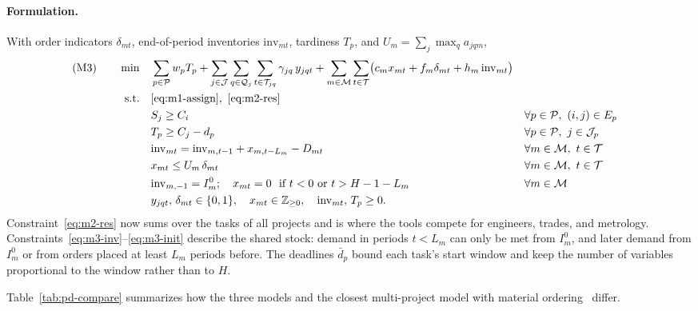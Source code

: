 \paragraph{Formulation.}
With order indicators $\delta_{mt}$, end-of-period inventories
$\mathrm{inv}_{mt}$, tardiness $T_p$, and
$U_m = \sum_{j} \max_{q} a_{jqm}$,
\begin{align}
    \text{(M3)} \qquad \min \quad
    & \sum_{p \in \mathcal{P}} w_p T_p
      + \sum_{j \in \mathcal{J}} \sum_{q \in \mathcal{Q}_j} \sum_{t \in \mathcal{T}_{jq}} \gamma_{jq}\, y_{jqt}
      + \sum_{m \in \mathcal{M}} \sum_{t \in \mathcal{T}} \bigl( c_m x_{mt} + f_m \delta_{mt} + h_m\, \mathrm{inv}_{mt} \bigr)
      \label{eq:m3-obj} \\
    \text{s.t.} \quad
    & \text{\eqref{eq:m1-assign}},\ \text{\eqref{eq:m2-res}} \nonumber \\
    & S_j \ge C_i
      && \forall p \in \mathcal{P},\ (i,j) \in E_p \label{eq:m3-prec} \\
    & T_p \ge C_j - d_p
      && \forall p \in \mathcal{P},\ j \in \mathcal{J}_p \label{eq:m3-tard} \\
    & \mathrm{inv}_{mt} = \mathrm{inv}_{m,t-1} + x_{m,t-L_m} - D_{mt}
      && \forall m \in \mathcal{M},\ t \in \mathcal{T} \label{eq:m3-inv} \\
    & x_{mt} \le U_m\, \delta_{mt}
      && \forall m \in \mathcal{M},\ t \in \mathcal{T} \label{eq:m3-setup} \\
    & \mathrm{inv}_{m,-1} = I^0_m; \quad x_{mt} = 0 \ \text{ if } t < 0 \text{ or } t > H - 1 - L_m
      && \forall m \in \mathcal{M} \label{eq:m3-init} \\
    & y_{jqt},\, \delta_{mt} \in \{0,1\}, \quad x_{mt} \in \mathbb{Z}_{\ge 0}, \quad
      \mathrm{inv}_{mt},\, T_p \ge 0. \label{eq:m3-dom}
\end{align}
Constraint~\eqref{eq:m2-res} now sums over the tasks of all projects and is
where the tools compete for engineers, trades, and metrology.
Constraints~\eqref{eq:m3-inv}--\eqref{eq:m3-init} describe the shared stock:
demand in periods $t < L_m$ can only be met from $I^0_m$, and later demand
from $I^0_m$ or from orders placed at least $L_m$ periods before. The
deadlines $\bar d_p$ bound each task's start window and keep the number of
variables proportional to the window rather than to $H$.

Table~\ref{tab:pd-compare} summarizes how the three models and the closest
multi-project model with material ordering~\citep{hu2025supplier} differ.

